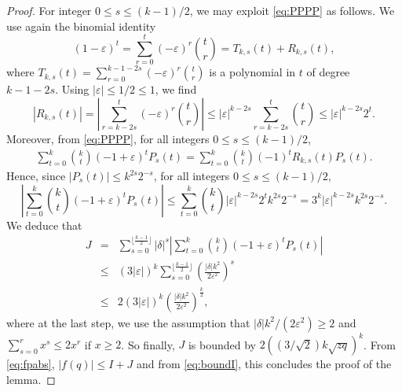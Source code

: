 \documentclass[11pt]{article}
\newcommand{\ABS}[1]{{{\left| #1 \right|}}} %
\newcommand{\PAR}[1]{{{\left(#1\right)}}} %
\newcommand{\1}{1\!\!{\sf I}}\newcommand{\IND}{\1}
\newcommand{\veps}{\varepsilon}
\begin{document}
\begin{proof}
For integer $0 \leq s \leq    (k -1)/2 $, we may  exploit \eqref{eq:PPPP} as follows. We use again the binomial identity
$$
\PAR{1 - \veps}^t  = \sum_{r=0}^{t} (-\veps)^r {t \choose r} =  T_{k,  s} (t) + R_{k,s} (t),
$$
where $T_{k,s} (t) = \sum_{r=0}^{k-1 - 2s} (-\veps)^r {t \choose r}$ is a polynomial in $t$ of degree $k-1 - 2s $. Using $ | \veps| \leq 1/2 \leq 1$, we find
$$
|R_ {k,s} (t)|   =    \ABS{ \sum_{r=k - 2s}^{t}   (-\veps)^r  {t \choose r} } \leq  |  \veps|^{k-2s}  \sum_{r=k - 2s}^{t}   {t \choose r}     \leq |  \veps| ^{k - 2 s}2^{t} .
$$
Moreover,  from \eqref{eq:PPPP},   for all integers $0 \leq  s \leq   (k -1)/2  $,
\begin{eqnarray*}
 \sum_{t=0} ^k  {k \choose t} (-1+\veps)^{t}  P_s(t) =    \sum_{t=0} ^k  {k \choose t} ( -1) ^t  R_{k,s} (t) P_s(t).
\end{eqnarray*}
Hence, since $|P_s(t)| \leq k ^{2s} 2^{-s}$, for all integers $0 \leq  s \leq  (k -1)/2 $,
$$
 \ABS{ \sum_{t=0} ^k  {k \choose t} (-1+\veps)^{t}  P_s(t)} \leq  \sum_{t=0} ^k  {k \choose t}   |  \veps| ^{k - 2 s} 2^{t} k^{2s} 2^{-s}  = 3^{k}  | \veps| ^{k - 2 s}  k^{2s} 2^{-s}.
$$
We deduce that 
\begin{eqnarray*}
J    &= &   \sum_{s=0}^{ \lfloor \frac{k -1}{2} \rfloor}     |\delta|^s  \ABS{  \sum_{t=0} ^k  {k \choose t} (-1+\veps)^{t}  P_s(t)} \\
& \leq &    \PAR{ 3  |\veps|}^{k}  \sum_{s=0}^{ \lfloor \frac{k -1}{2} \rfloor}   \PAR{ \frac{|\delta| k^2}{ 2 \veps^2}} ^s \\
& \leq  & 2 \PAR{ 3 |\veps|}^{k}   \PAR{ \frac{|\delta| k^2}{  2 \veps^{2} }} ^{\frac k 2 }, \label{eq:2rfr}
\end{eqnarray*}
where at the last step, we use the assumption that $|\delta| k^2 / ( 2 \veps^2) \geq 2 $ and $\sum_{s=0}^r x^s \leq 2 x^r$ if $x \geq 2$. So finally, $J$ is  bounded by $2  \PAR{  (3/\sqrt 2) k  \sqrt { z q}  } ^k$. From \eqref{eq:fpabs}, $|f(q)| \leq I + J $  and from \eqref{eq:boundI}, this concludes the proof of the lemma. 
\end{proof}
\end{document}
